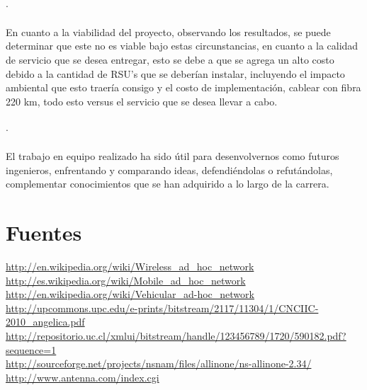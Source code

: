 \documentclass[12pt]{article}
\begin{document}
\paragraph{$\cdot$}
En cuanto a la viabilidad del proyecto, observando los resultados, se puede determinar que este no es 
viable bajo estas circunstancias, en cuanto a la calidad de servicio que se desea entregar, esto se debe 
a que se agrega un alto costo debido a la cantidad de RSU’s que se deberían instalar, incluyendo el 
impacto ambiental que esto traería consigo y el costo de implementación, cablear con fibra 220 km, todo 
esto versus el servicio que se desea llevar a cabo.
\paragraph{$\cdot$}
El trabajo en equipo realizado ha sido útil para desenvolvernos como futuros ingenieros, enfrentando y 
comparando ideas, defendiéndolas o refutándolas, complementar conocimientos que se han adquirido a lo largo 
de la carrera.

\newpage

%
\section{Fuentes}
\url{http://en.wikipedia.org/wiki/Wireless_ad_hoc_network}\\

\url{http://es.wikipedia.org/wiki/Mobile_ad_hoc_network}\\

\url{http://en.wikipedia.org/wiki/Vehicular_ad-hoc_network}\\

\url{http://upcommons.upc.edu/e-prints/bitstream/2117/11304/1/CNCIIC-2010_angelica.pdf}\\

\url{http://repositorio.uc.cl/xmlui/bitstream/handle/123456789/1720/590182.pdf?sequence=1}\\

\url{http://sourceforge.net/projects/nsnam/files/allinone/ns-allinone-2.34/}\\

\url{http://www.antenna.com/index.cgi}\\

\end{document}
